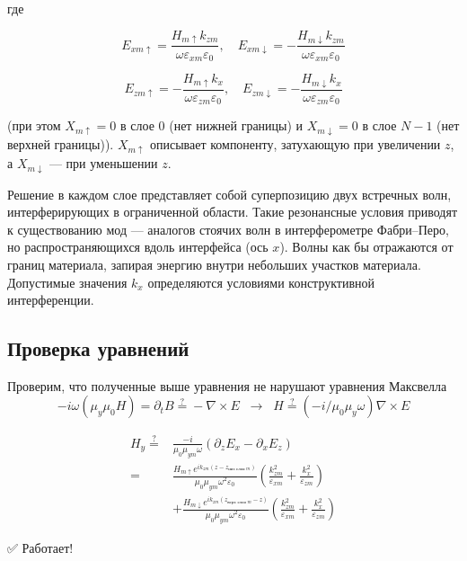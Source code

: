 \documentclass{article}
\begin{document}
где

$$
E_{xm\uparrow} = \frac{H_{m\uparrow} k_{zm}}{\omega \varepsilon_{xm} \varepsilon_0}, \quad
E_{xm\downarrow} = -\frac{H_{m\downarrow} k_{zm}}{\omega \varepsilon_{xm} \varepsilon_0}
$$

$$
E_{zm\uparrow} = -\frac{H_{m\uparrow} k_x}{\omega \varepsilon_{zm} \varepsilon_0}, \quad
E_{zm\downarrow} = -\frac{H_{m\downarrow} k_x}{\omega \varepsilon_{zm} \varepsilon_0}
$$

(при этом $X_{m\uparrow}=0$ в слое $0$ (нет нижней границы) и $X_{m\downarrow}=0$ в слое $N-1$ (нет верхней границы)). $X_{m\uparrow}$ описывает компоненту, затухающую при увеличении $z$, а $X_{m\downarrow}$ — при уменьшении $z$.

Решение в каждом слое представляет собой суперпозицию двух встречных волн, интерферирующих в ограниченной области. Такие резонансные условия приводят к существованию мод — аналогов стоячих волн в интерферометре Фабри–Перо, но распространяющихся вдоль интерфейса (ось $x$). Волны как бы отражаются от границ материала, запирая энергию внутри небольших участков материала. Допустимые значения $k_x$ определяются условиями конструктивной интерференции.


\subsection{Проверка уравнений}

Проверим, что полученные выше уравнения не нарушают уравнения Максвелла
$$
-i\omega (\mu_y \mu_0 H) = \partial_t B \stackrel{?}{=} -\nabla \times E \;\; \rightarrow \;\; H \stackrel{?}{=} (-i/\mu_0\mu_y\omega)\nabla \times E
$$

\begin{equation}
\begin{aligned}
H_y \stackrel{?}{=} & \frac{-i}{\mu_0 \mu_{ym} \omega} \left(\partial_z E_x - \partial_x E_z\right) \\
= & \frac{H_{m\uparrow} e^{i k_{zm} (z-z_{\text{низ слоя } m})}}{\mu_0 \mu_{ym} \omega^2 \varepsilon_0}
\left(\frac{k_{zm}^2}{\varepsilon_{xm}} + \frac{k_x^2}{\varepsilon_{zm}}\right) \\
& + \frac{H_{m\downarrow} e^{i k_{zm} (z_{\text{верх слоя } m} - z)}}{\mu_0 \mu_{ym} \omega^2 \varepsilon_0}
\left(\frac{k_{zm}^2}{\varepsilon_{xm}} + \frac{k_x^2}{\varepsilon_{zm}}\right)
\end{aligned}
\end{equation}

✅ Работает!
\end{document}
